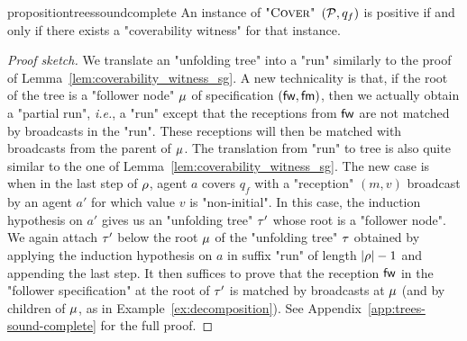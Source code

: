 \begin{restatable}{proposition}{treessoundcomplete}
	\label{prop:trees-sound-complete}
	An instance of $\textsc{"Cover"}$ $(\mathcal{P},q_f)$ is positive if and only if there exists a "coverability witness" for that instance.
\end{restatable}
\begin{proof}[Proof sketch]
	We translate an "unfolding tree" into a "run" similarly to the proof of Lemma~\ref{lem:coverability_witness_sg}. A new technicality is that, if the root of the tree is a "follower node" $\mu$ of specification $(\mathsf{fw}, \mathsf{fm})$, then we actually obtain a "partial run", \emph{i.e.}, a "run" except that the receptions from $\mathsf{fw}$ are not matched by broadcasts in the "run". These receptions will then be matched with broadcasts from the parent of $\mu$.
	The translation from "run" to tree is also quite similar to the one of Lemma~\ref{lem:coverability_witness_sg}. The new case is when in the last step of $\rho$, agent $a$ covers $q_f$ with a "reception" $(m,v)$ broadcast by an agent $a'$ for which value $v$ is "non-initial". 
	In this case, the induction hypothesis on $a'$ gives us an "unfolding tree" $\tau'$ whose root is a "follower node". We again attach $\tau'$ below the root $\mu$ of the "unfolding tree" $\tau$ obtained by applying the induction hypothesis on $a$ in suffix "run" of length $|\rho|-1$ and appending the last step. 
	It then suffices to prove that the reception $\mathsf{fw}$ in the "follower specification" at the root of $\tau'$ is matched by broadcasts at $\mu$ (and by children of $\mu$, as in Example~\ref{ex:decomposition}). See Appendix~\ref{app:trees-sound-complete} for the full proof. 

\end{proof}
